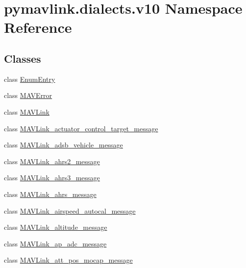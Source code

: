 \hypertarget{namespacepymavlink_1_1dialects_1_1v10}{}\section{pymavlink.\+dialects.\+v10 Namespace Reference}
\label{namespacepymavlink_1_1dialects_1_1v10}
\subsection*{Classes}
\begin{DoxyCompactItemize}
\item 
class \hyperlink{classpymavlink_1_1dialects_1_1v10_1_1EnumEntry}{Enum\+Entry}
\item 
class \hyperlink{classpymavlink_1_1dialects_1_1v10_1_1MAVError}{M\+A\+V\+Error}
\item 
class \hyperlink{classpymavlink_1_1dialects_1_1v10_1_1MAVLink}{M\+A\+V\+Link}
\item 
class \hyperlink{classpymavlink_1_1dialects_1_1v10_1_1MAVLink__actuator__control__target__message}{M\+A\+V\+Link\+\_\+actuator\+\_\+control\+\_\+target\+\_\+message}
\item 
class \hyperlink{classpymavlink_1_1dialects_1_1v10_1_1MAVLink__adsb__vehicle__message}{M\+A\+V\+Link\+\_\+adsb\+\_\+vehicle\+\_\+message}
\item 
class \hyperlink{classpymavlink_1_1dialects_1_1v10_1_1MAVLink__ahrs2__message}{M\+A\+V\+Link\+\_\+ahrs2\+\_\+message}
\item 
class \hyperlink{classpymavlink_1_1dialects_1_1v10_1_1MAVLink__ahrs3__message}{M\+A\+V\+Link\+\_\+ahrs3\+\_\+message}
\item 
class \hyperlink{classpymavlink_1_1dialects_1_1v10_1_1MAVLink__ahrs__message}{M\+A\+V\+Link\+\_\+ahrs\+\_\+message}
\item 
class \hyperlink{classpymavlink_1_1dialects_1_1v10_1_1MAVLink__airspeed__autocal__message}{M\+A\+V\+Link\+\_\+airspeed\+\_\+autocal\+\_\+message}
\item 
class \hyperlink{classpymavlink_1_1dialects_1_1v10_1_1MAVLink__altitude__message}{M\+A\+V\+Link\+\_\+altitude\+\_\+message}
\item 
class \hyperlink{classpymavlink_1_1dialects_1_1v10_1_1MAVLink__ap__adc__message}{M\+A\+V\+Link\+\_\+ap\+\_\+adc\+\_\+message}
\item 
class \hyperlink{classpymavlink_1_1dialects_1_1v10_1_1MAVLink__att__pos__mocap__message}{M\+A\+V\+Link\+\_\+att\+\_\+pos\+\_\+mocap\+\_\+message}

\end{DoxyCompactItemize}
